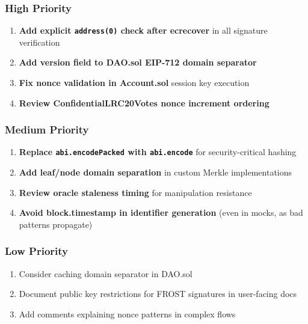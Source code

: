 \documentclass[
]{article}
\providecommand{\tightlist}{%
  \setlength{\itemsep}{0pt}\setlength{\parskip}{0pt}}
\begin{document}
\subsubsection{High Priority}\label{high-priority}

\begin{enumerate}
\def\labelenumi{\arabic{enumi}.}
\setcounter{enumi}{2}
\tightlist
\item
  \textbf{Add explicit \texttt{address(0)} check after ecrecover} in all
  signature verification
\item
  \textbf{Add version field to DAO.sol EIP-712 domain separator}
\item
  \textbf{Fix nonce validation in Account.sol} session key execution
\item
  \textbf{Review ConfidentialLRC20Votes nonce increment ordering}
\end{enumerate}

\subsubsection{Medium Priority}\label{medium-priority}

\begin{enumerate}
\def\labelenumi{\arabic{enumi}.}
\setcounter{enumi}{6}
\tightlist
\item
  \textbf{Replace \texttt{abi.encodePacked} with \texttt{abi.encode}}
  for security-critical hashing
\item
  \textbf{Add leaf/node domain separation} in custom Merkle
  implementations
\item
  \textbf{Review oracle staleness timing} for manipulation resistance
\item
  \textbf{Avoid block.timestamp in identifier generation} (even in
  mocks, as bad patterns propagate)
\end{enumerate}

\subsubsection{Low Priority}\label{low-priority}

\begin{enumerate}
\def\labelenumi{\arabic{enumi}.}
\setcounter{enumi}{10}
\tightlist
\item
  Consider caching domain separator in DAO.sol
\item
  Document public key restrictions for FROST signatures in user-facing
  docs
\item
  Add comments explaining nonce patterns in complex flows
\end{enumerate}
\end{document}

